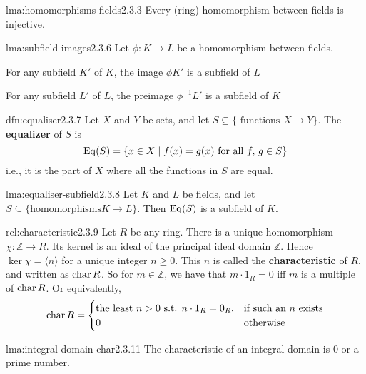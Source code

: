 \documentclass[landscape, 8pt]{extarticle}
\begin{document}
\begin{multicols}{3}
\begin{lma}{lma:homomorphisms-fields}{2.3.3}
    Every (ring) homomorphism between fields is injective.
\end{lma}

\begin{lma}{lma:subfield-images}{2.3.6}
    Let $\phi : K \to L$ be a homomorphism between fields.
    \begin{enumerate-tight}
        \item For any subfield $K'$ of $K$, the image $\phi K'$ is a subfield of $L$
        \item For any subfield $L'$ of $L$, the preimage $\phi^{-1}L'$ is a subfield of $K$
    \end{enumerate-tight}
\end{lma}

\begin{dfn}[Equaliser]{dfn:equaliser}{2.3.7}
    Let $X$ and $Y$ be sets, and let $S \subseteq \{ \text{ functions } X \to Y\}$. The \textbf{equalizer} of $S$ is
    \[\operatorname{Eq}(S) = \{x\in X \mid f(x) = g(x) \text{ for all } f,\,g\in S\}\]
    i.e., it is the part of $X$ where all the functions in $S$ are equal.
\end{dfn}

\begin{lma}{lma:equaliser-subfield}{2.3.8}
    Let $K$ and $L$ be fields, and let $S \subseteq \{\text{homomorphisms} K \to L\}$. Then $\operatorname{Eq}(S)$ is a subfield of $K$.
\end{lma}

\begin{rcl}[Characteristic]{rcl:characteristic}{2.3.9}
    Let $R$ be any ring. There is a unique homomorphism $\chi : \mathbb{Z} \to R$. Its kernel is an ideal of the principal ideal domain $\mathbb{Z}$. Hence $\ker \chi = \langle n \rangle$ for a unique integer $n \ge 0$. This $n$ is called the \textbf{characteristic} of $R$, and written as $\operatorname{char} R$. So for $m\in \mathbb{Z}$, we have that $m \cdot 1_{R} = 0$ iff $m$ is a multiple of $\operatorname{char} R$. Or equivalently,
    \[\operatorname{char} R = \begin{cases}
        \text{the least $n > 0$ s.t. $n \cdot 1_{R} = 0_{R}$}, & \text{if such an $n$ exists}\\
        0 & \text{otherwise}
    \end{cases}\]
\end{rcl}

\begin{lma}{lma:integral-domain-char}{2.3.11}
    The characteristic of an integral domain is $0$ or a prime number.
\end{lma}


\end{multicols}
\end{document}
